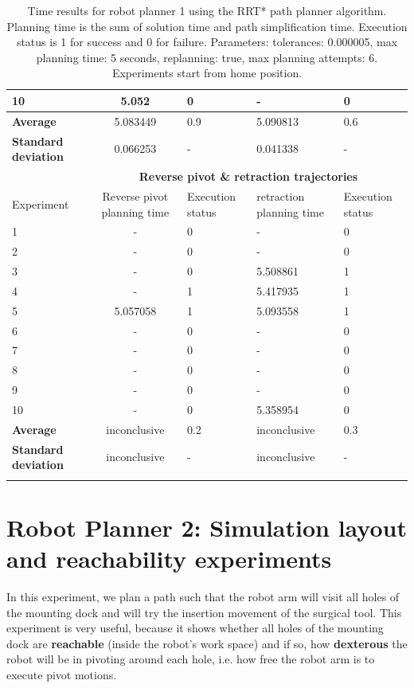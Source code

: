 \begin{longtable}{|p{2cm}|c|p{2cm}|p{2cm}|p{2cm}|}
10  & 5.052 & 0  & - &  0 \\
\hline
\textbf{Average} & 	5.083449	& 0.9	& 5.090813	& 0.6 \\
\hline
\textbf{Standard deviation} & 	0.066253 &	- &	0.041338 & - \\
\hline
                          & \multicolumn{4}{c}{\textbf{Reverse pivot \& retraction trajectories}}                     \vline \\
\hline
Experiment                & Reverse pivot planning time & Execution status & retraction planning time & Execution status  \\
\hline
1 & -	& 0	& -	& 0 \\
2 & -	& 0	& -	& 0 \\
3 & -	& 0	& 5.508861	& 1 \\
4 & -	& 1	& 5.417935	& 1 \\
5 & 5.057058	& 1	& 5.093558	& 1 \\
6 & -	& 0	& -	& 0 \\
7 & -	& 0	& -	& 0 \\
8 & -	& 0	& -	& 0 \\
9 & -	& 0	& -	& 0 \\
10  & -	& 0	& 5.358954	& 0 \\
\hline
\textbf{Average} & inconclusive	& 0.2	& inconclusive	& 0.3 \\
\hline
\textbf{Standard deviation} & 	inconclusive &	- &	inconclusive & - \\
\hline
\caption{Time results for robot planner 1 using the RRT* path planner algorithm. Planning time is the sum of solution time and path simplification time. Execution status is 
1 for success and 0 for failure. Parameters: tolerances: 0.000005, max planning time: 5 seconds, replanning: true, max planning attempts: 6. Experiments start from home position.}
\label{robot-planner1-rrtstar-data}
\end{longtable}


\section{Robot Planner 2: Simulation layout and reachability experiments}
\label{section:robot-planner2}

In this experiment, we plan a path such that the robot arm will visit all holes of the mounting dock and will try the insertion movement of the surgical tool.
This experiment is very useful, because it shows whether all holes of the mounting dock are \textbf{reachable} (inside the robot's work space) and if so, how 
\textbf{dexterous} the robot will be in pivoting around each hole, i.e. how free the robot arm is to execute pivot motions.

